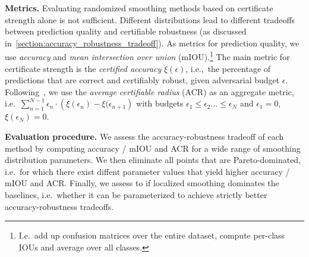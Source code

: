 \documentclass{article} %
\theoremstyle{plain}
\theoremstyle{definition}
\theoremstyle{remark}
\begin{document}
\textbf{Metrics.}
Evaluating randomized smoothing methods based on certificate strength alone is not sufficient.
Different distributions lead to different tradeoffs between prediction quality and certifiable robustness (as discussed in~\autoref{section:accuracy_robustness_tradeoff}).
As metrics for prediction quality, we use \textit{accuracy} and \textit{mean intersection over union} (mIOU).\footnote{I.e.\ add up confusion matrices over the entire dataset, compute per-class IOUs and average over all classes.}
The main metric for certificate strength is the \textit{certified accuracy} $\xi(\epsilon)$, i.e.,~the percentage of predictions that are correct and certifiably robust, given adversarial budget $\epsilon$. 
Following~\citep{Schuchardt2021}, we use the  \textit{average certifiable radius} (ACR) as an aggregate metric, i.e.\ 
$\sum_{n=1}^{N-1} \epsilon_n \cdot \left(\xi(\epsilon_n) - \xi(\epsilon_{n+1}\right)$ with budgets $\epsilon_1 \leq \epsilon_2 \dots \leq \epsilon_N$ and $\epsilon_1 = 0$, $\xi(\epsilon_N) = 0$.

\textbf{Evaluation procedure.}
We assess the accuracy-robustness tradeoff of each method by computing accuracy / mIOU and ACR for a wide range of smoothing distribution parameters.
We then eliminate all points that are Pareto-dominated, i.e.~for which there exist diffent parameter values that yield higher accuracy / mIOU and ACR.
Finally, we assess to if  localized smoothing dominates the baselines, i.e.~whether it can be parameterized to achieve strictly better accuracy-robustness tradeoffs.

\end{document}
